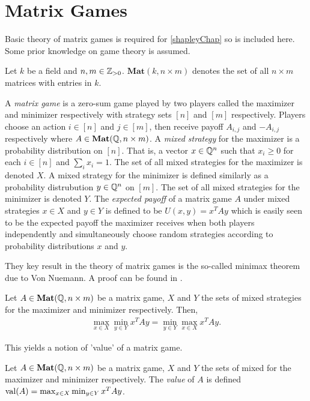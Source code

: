 \section{Matrix Games}
Basic theory of matrix games is required for \cref{shapleyChap} so is included here. Some prior knowledge on game theory is assumed.
\begin{notation}
  Let $k$ be a field and $n, m \in \mathbb{Z}_{> 0}$. $\mathbf{Mat}(k, n \times m)$ denotes the set of all $n \times m$
  matrices with entries in $k$.
\end{notation}
\begin{definition}
  A \emph{matrix game} is a zero-sum game played by two players called the maximizer and minimizer respectively with
  strategy sets $[n]$ and $[m]$ respectively. Players choose an action $i \in [n]$ and $j \in [m]$, then receive
  payoff $A_{i, j}$ and $-A_{i, j}$ respectively where $A \in \mathbf{Mat}(\mathbb{Q}, n \times m)$.
  A \emph{mixed strategy} for the maximizer is a probability distribution on $[n]$. That is,
  a vector $x \in \mathbb{Q}^n$ such that $x_i \geq 0$ for each $i \in [n]$ and $\sum_{i} x_i = 1$. The
  set of all mixed strategies for the maximizer is denoted $X$.
  A mixed strategy for the minimizer is defined similarly as a probability distrubution $y \in \mathbb{Q}^n$ on $[m]$.
  The set of all mixed strategies for the minimizer is denoted $Y$.
  The \emph{expected payoff} of a matrix game $A$ under mixed strategies $x \in X$ and $y \in Y$ is defined
  to be $U(x, y) = x^T A y$ which is easily seen to be the expected payoff the maximizer receives
  when both players independently and simultaneously choose random strategies according to probability
  distributions $x$ and $y$.
\end{definition}
They key result in the theory of matrix games is the so-called minimax theorem due to Von Nuemann. A
proof can be found in \citep[Chapter 15]{matrixGamesChvatal}.
\begin{theorem}
  Let $A \in \mathbf{Mat}(\mathbb{Q}, n \times m)$ be a matrix game, $X$ and $Y$ the sets of mixed
  strategies for the maximizer and minimizer respectively. Then,
  \begin{align*}
    \max_{x \in X} \min_{y \in Y} x^T A y = \min_{y \in Y}\max_{x \in X} x^T A y.
  \end{align*}
\end{theorem}
This yields a notion of 'value' of a matrix game.
\begin{definition} \label{matrixGameVal}
  Let $A \in \mathbf{Mat}(\mathbb{Q}, n \times m)$ be a matrix game, $X$ and $Y$ the sets of mixed
  for the maximizer and minimizer respectively. The \emph{value} of $A$ is defined 
  $\mathrm{val}(A) = \max_{x \in X} \min_{y \in Y} x^T A y$.
\end{definition}
